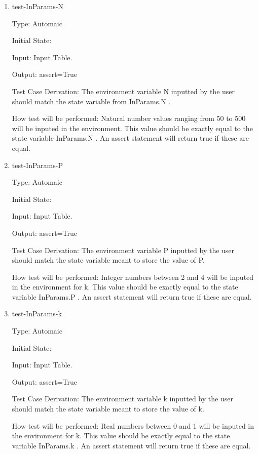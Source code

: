 \documentclass[12pt, titlepage]{article}
\begin{document}
\begin{enumerate}

\item{test-InParams-N\\} \label{INPARAMS}

Type: Automaic 
					
Initial State: 
					
Input: Input Table. 
					
Output: assert=True 

Test Case Derivation: The environment variable N inputted by the user should 
match the state variable from InParams.N .

How test will be performed: Natural number values ranging from 50 to 500 will 
be 
inputed in the environment. This value should be exactly equal to the state 
variable InParams.N . An assert statement will return true if these are equal.  
				

\item{test-InParams-P\\}

Type: Automaic 

Initial State: 

Input: Input Table.

Output: assert=True

Test Case Derivation: The environment variable P inputted by the user should 
match the state variable meant to store the value of P.

How test will be performed: Integer numbers between 2 and 4 
will be inputed in the environment for k. This value should be exactly equal to 
the state variable InParams.P .  An assert statement will return true if these 
are equal.

\item{test-InParams-k\\}

Type: Automaic

Initial State: 

Input: Input Table.

Output: assert=True

Test Case Derivation: The environment variable k inputted by the user should 
match the state variable meant to store the value of k.

How test will be performed: Real numbers between 0 and 1 
will be inputed in the environment for k. This value should be exactly equal to 
the state variable InParams.k . An assert statement will return true if these 
are equal.
    
\end{enumerate}
\end{document}
